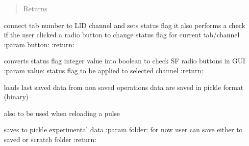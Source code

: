 \documentclass[letterpaper,10pt,english]{sphinxmanual}
\begin{document}
\begin{fulllineitems}
\begin{fulllineitems}
\begin{quote}
\begin{description}
\item[{Returns}] \leavevmode


\end{description}\end{quote}

\end{fulllineitems}


\begin{fulllineitems}
\label{Cormat_main:Cormat_main.CORMAT_GUI.checkstate}
connect tab number to LID channel and sets status flag
it also performs a check if the user clicked a radio button to change status flag for current tab/channel
:param button:
:return:

\end{fulllineitems}


\begin{fulllineitems}
\label{Cormat_main:Cormat_main.CORMAT_GUI.set_status_flag_radio}
converts status flag integer value into boolean to check SF radio buttons in GUI
:param value: status flag to be applied to selected channel
:return:

\end{fulllineitems}


\begin{fulllineitems}
\label{Cormat_main:Cormat_main.CORMAT_GUI.load_pickle}
loads last saved data from non saved operations
data are saved in pickle format (binary)

also to be used when reloading a pulse

\end{fulllineitems}


\begin{fulllineitems}
\label{Cormat_main:Cormat_main.CORMAT_GUI.save_to_pickle}
saves to pickle experimental data
:param folder: for now user can save either to saved or scratch folder
:return:


\end{fulllineitems}
\end{fulllineitems}
\end{document}

